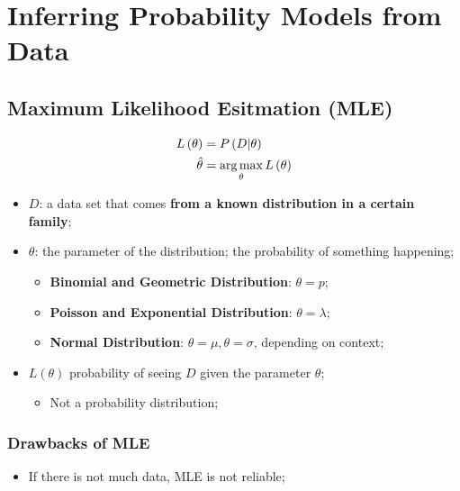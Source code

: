 \chapter{Inferring Probability Models from Data}

\section{Maximum Likelihood Esitmation (MLE)}

  \begin{align}
    L\left( \theta \right) &= P \left( D | \theta \right) \\
    \hat{\theta} &= \operatorname*{arg\,max}_{\theta} L \left( \theta \right)
  \end{align}
  
  \begin{itemize}
    \item $ D $: a data set that comes \textbf{from a known distribution in a certain family};
    \item $ \theta $: the parameter of the distribution; the probability of something happening;
    \begin{itemize}
      \item \textbf{Binomial and Geometric Distribution}: $ \theta = p $;
      \item \textbf{Poisson and Exponential Distribution}: $ \theta = \lambda $;
      \item \textbf{Normal Distribution}: $ \theta = \mu, \theta = \sigma $, depending on context;
    \end{itemize}

    \item $ L\left( \theta \right) $ probability of seeing $ D $ given the parameter $ \theta $;
    \begin{itemize}
      \item Not a probability distribution;
    \end{itemize}
  \end{itemize}
  
  \subsection{Drawbacks of MLE}
  
    \begin{itemize}
      \item If there is not much data, MLE is not reliable;
    \end{itemize}
    
